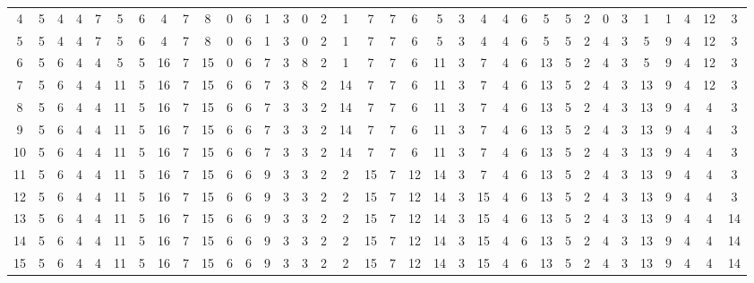 \documentclass[12pt]{elsarticle}
\newtheorem*{theorem A}{Theorem A}
\newtheorem*{theorem B}{N\"olker's Theorem}
\theoremstyle{remark}
\theoremstyle{remark}
\theoremstyle{definition}
\begin{document}
\begin{landscape}
\begin{table}[]
{\begin{tabular}{c|cccccccccccccccccccccccccccccccccc}
			4  & 5 & 4 & 4 & 7 & 5  & 6 & 4  & 7 & 8  & 0 & 6  & 1  & 3  & 0  & 2  & 1  & 7  & 7  & 6  & 5  & 3  & 4  & 4  & 6  & 5  & 5  & 2  & 0  & 3          & 1  & 1  & 4  & 12 & 3  \\
			5  & 5 & 4 & 4 & 7 & 5  & 6 & 4  & 7 & 8  & 0 & 6  & 1  & 3  & 0  & 2  & 1  & 7  & 7  & 6  & 5  & 3  & 4  & 4  & 6  & 5  & 5  & 2  & 4  & 3          & 5  & 9  & 4  & 12 & 3  \\
			6  & 5 & 6 & 4 & 4 & 5  & 5 & 16 & 7 & 15 & 0 & 6  & 7  & 3  & 8  & 2  & 1  & 7  & 7  & 6  & 11 & 3  & 7  & 4  & 6  & 13 & 5  & 2  & 4  & 3          & 5  & 9  & 4  & 12 & 3  \\
			7  & 5 & 6 & 4 & 4 & 11 & 5 & 16 & 7 & 15 & 6 & 6  & 7  & 3  & 8  & 2  & 14 & 7  & 7  & 6  & 11 & 3  & 7  & 4  & 6  & 13 & 5  & 2  & 4  & 3          & 13 & 9  & 4  & 12 & 3  \\
			8  & 5 & 6 & 4 & 4 & 11 & 5 & 16 & 7 & 15 & 6 & 6  & 7  & 3  & 3  & 2  & 14 & 7  & 7  & 6  & 11 & 3  & 7  & 4  & 6  & 13 & 5  & 2  & 4  & 3          & 13 & 9  & 4  & 4  & 3  \\
			9  & 5 & 6 & 4 & 4 & 11 & 5 & 16 & 7 & 15 & 6 & 6  & 7  & 3  & 3  & 2  & 14 & 7  & 7  & 6  & 11 & 3  & 7  & 4  & 6  & 13 & 5  & 2  & 4  & 3          & 13 & 9  & 4  & 4  & 3  \\
			10 & 5 & 6 & 4 & 4 & 11 & 5 & 16 & 7 & 15 & 6 & 6  & 7  & 3  & 3  & 2  & 14 & 7  & 7  & 6  & 11 & 3  & 7  & 4  & 6  & 13 & 5  & 2  & 4  & 3          & 13 & 9  & 4  & 4  & 3  \\
			11 & 5 & 6 & 4 & 4 & 11 & 5 & 16 & 7 & 15 & 6 & 6  & 9  & 3  & 3  & 2  & 2  & 15 & 7  & 12 & 14 & 3  & 7  & 4  & 6  & 13 & 5  & 2  & 4  & 3          & 13 & 9  & 4  & 4  & 3  \\
			12 & 5 & 6 & 4 & 4 & 11 & 5 & 16 & 7 & 15 & 6 & 6  & 9  & 3  & 3  & 2  & 2  & 15 & 7  & 12 & 14 & 3  & 15 & 4  & 6  & 13 & 5  & 2  & 4  & 3          & 13 & 9  & 4  & 4  & 3  \\
			13 & 5 & 6 & 4 & 4 & 11 & 5 & 16 & 7 & 15 & 6 & 6  & 9  & 3  & 3  & 2  & 2  & 15 & 7  & 12 & 14 & 3  & 15 & 4  & 6  & 13 & 5  & 2  & 4  & 3          & 13 & 9  & 4  & 4  & 14 \\
			14 & 5 & 6 & 4 & 4 & 11 & 5 & 16 & 7 & 15 & 6 & 6  & 9  & 3  & 3  & 2  & 2  & 15 & 7  & 12 & 14 & 3  & 15 & 4  & 6  & 13 & 5  & 2  & 4  & 3          & 13 & 9  & 4  & 4  & 14 \\
			15 & 5 & 6 & 4 & 4 & 11 & 5 & 16 & 7 & 15 & 6 & 6  & 9  & 3  & 3  & 2  & 2  & 15 & 7  & 12 & 14 & 3  & 15 & 4  & 6  & 13 & 5  & 2  & 4  & 3          & 13 & 9  & 4  & 4  & 14 \\

\end{tabular}}
\end{table}
\end{landscape}
\end{document}
